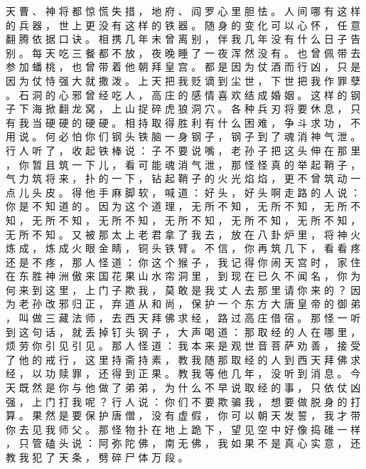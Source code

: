 {天 曹 、 神 将 都 惊 慌 失 措 ， 地 府 、 阎 罗 心 里 胆 怯 。
人 间 哪 有 这 样 的 兵 器 ， 世 上 更 没 有 这 样 的 铁 器 。
随 身 的 变 化 可 以 心 怀 ， 任 意 翻 腾 依 据 口 诀 。
相 携 几 年 未 曾 离 别 ， 伴 我 几 年 没 有 什 么 日 子 告 别 。
每 天 吃 三 餐 都 不 放 ， 夜 晚 睡 了 一 夜 浑 然 没 有 。
也 曾 佩 带 去 参 加 蟠 桃 ， 也 曾 带 着 他 朝 拜 皇 宫 。
都 是 因 为 仗 酒 而 行 凶 ， 只 是 因 为 仗 恃 强 大 就 撒 泼 。
上 天 把 我 贬 谪 到 尘 世 ， 下 世 把 我 作 罪 孽 。
石 洞 的 心 邪 曾 经 吃 人 ， 高 庄 的 感 情 喜 欢 结 成 婚 姻 。
这 样 的 钢 子 下 海 掀 翻 龙 窝 ， 上 山 捉 碎 虎 狼 洞 穴 。
各 种 兵 刃 将 要 休 息 ， 只 有 我 当 硬 硬 的 硬 硬 。
相 持 取 得 胜 利 有 什 么 困 难 ， 争 斗 求 功 ， 不 用 说 。
何 必 怕 你 们 钢 头 铁 脑 一 身 钢 子 ， 钢 子 到 了 魂 消 神 气 泄 。
行 人 听 了 ， 收 起 铁 棒 说 ： 子 不 要 说 嘴 ， 老 孙 子 把 这 头 伸 在 那 里 ， 你 暂 且 筑 一 下 儿 ， 看 可 能 魂 消 气 泄 ， 那 怪 怪 真 的 举 起 鞘 子 ， 气 力 筑 将 来 ， 扑 的 一 下 ， 钻 起 鞘 子 的 火 光 焰 焰 ， 更 不 曾 筑 动 一 点 儿 头 皮 。
得 他 手 麻 脚 软 ， 喊 道 ： 好 头 ， 好 头 啊 走 路 的 人 说 ： 你 是 不 知 道 的 。
因 为 这 个 道 理 ， 无 所 不 知 ， 无 所 不 知 ， 无 所 不 知 ， 无 所 不 知 ， 无 所 不 知 ， 无 所 不 知 ， 无 所 不 知 ， 无 所 不 知 ， 无 所 不 知 。
又 被 那 太 上 老 君 拿 了 我 去 ， 放 在 八 卦 炉 里 ， 将 神 火 炼 成 ， 炼 成 火 眼 金 睛 ， 铜 头 铁 臂 。
不 信 ， 你 再 筑 几 下 ， 看 看 疼 还 是 不 疼 ， 那 人 怪 道 ： 你 这 个 猴 子 ， 我 记 得 你 闹 天 宫 时 ， 家 住 在 东 胜 神 洲 傲 来 国 花 果 山 水 帘 洞 里 ， 到 现 在 已 久 不 闻 名 ， 你 为 何 来 到 这 里 ， 上 门 子 欺 我 ， 莫 敢 是 我 丈 人 去 那 里 请 你 来 的 ？
因 为 老 孙 改 邪 归 正 ， 弃 道 从 和 尚 ， 保 护 一 个 东 方 大 唐 皇 帝 的 御 弟 ， 叫 做 三 藏 法 师 ， 去 西 天 拜 佛 求 经 ， 路 过 高 庄 借 宿 。
那 怪 一 听 到 这 句 话 ， 就 丢 掉 钉 头 钢 子 ， 大 声 喝 道 ： 那 取 经 的 人 在 哪 里 ， 烦 劳 你 引 见 引 见 。
那 人 怪 道 ： 我 本 来 是 观 世 音 菩 萨 劝 善 ， 接 受 了 他 的 戒 行 ， 这 里 持 斋 持 素 ， 教 我 随 那 取 经 的 人 到 西 天 拜 佛 求 经 ， 以 功 赎 罪 ， 还 得 到 正 果 。
教 我 等 他 几 年 ， 没 听 到 消 息 。
今 天 既 然 是 你 与 他 做 了 弟 弟 ， 为 什 么 不 早 说 取 经 的 事 ， 只 依 仗 凶 强 ， 上 门 打 我 呢 ？ 行 人 说 ： 你 们 不 要 欺 骗 我 ， 想 要 做 脱 身 的 打 算 。
果 然 是 要 保 护 唐 僧 ， 没 有 虚 假 ， 你 可 以 朝 天 发 誓 ， 我 才 带 你 去 见 我 师 父 。
那 怪 物 扑 在 地 上 跪 下 ， 望 见 空 中 好 像 捣 碓 一 样 ， 只 管 磕 头 说 ： 阿 弥 陀 佛 ， 南 无 佛 ， 我 如 果 不 是 真 心 实 意 ， 还 教 我 犯 了 天 条 ， 劈 碎 尸 体 万 段 。
}
